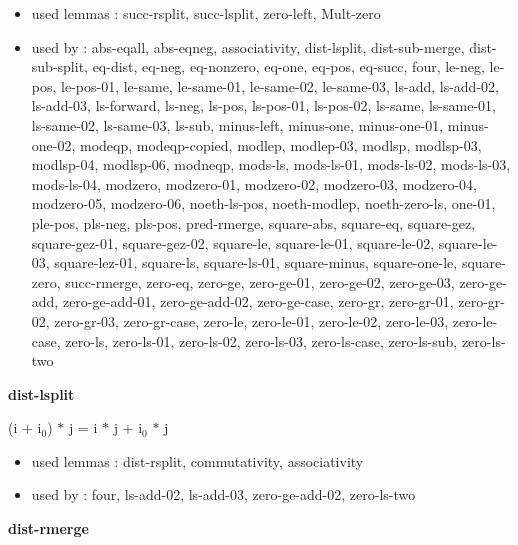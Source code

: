 \documentclass[a4paper]{article}
\begin{document}
\begin{itemize}


\item       used lemmas  : succ-rsplit, succ-lsplit, zero-left, Mult-zero
\item       used by      : abs-eqall, abs-eqneg, associativity, dist-lsplit, dist-sub-merge, dist-sub-split, eq-dist, eq-neg, eq-nonzero, eq-one, eq-pos, eq-succ, four, le-neg, le-pos, le-pos-01, le-same, le-same-01, le-same-02, le-same-03, ls-add, ls-add-02, ls-add-03, ls-forward, ls-neg, ls-pos, ls-pos-01, ls-pos-02, ls-same, ls-same-01, ls-same-02, ls-same-03, ls-sub, minus-left, minus-one, minus-one-01, minus-one-02, modeqp, modeqp-copied, modlep, modlep-03, modlsp, modlsp-03, modlsp-04, modlsp-06, modneqp, mods-ls, mods-ls-01, mods-ls-02, mods-ls-03, mods-ls-04, modzero, modzero-01, modzero-02, modzero-03, modzero-04, modzero-05, modzero-06, noeth-ls-pos, noeth-modlep, noeth-zero-ls, one-01, ple-pos, pls-neg, pls-pos, pred-rmerge, square-abs, square-eq, square-gez, square-gez-01, square-gez-02, square-le, square-le-01, square-le-02, square-le-03, square-lez-01, square-ls, square-ls-01, square-minus, square-one-le, square-zero, succ-rmerge, zero-eq, zero-ge, zero-ge-01, zero-ge-02, zero-ge-03, zero-ge-add, zero-ge-add-01, zero-ge-add-02, zero-ge-case, zero-gr, zero-gr-01, zero-gr-02, zero-gr-03, zero-gr-case, zero-le, zero-le-01, zero-le-02, zero-le-03, zero-le-case, zero-ls, zero-ls-01, zero-ls-02, zero-ls-03, zero-ls-case, zero-ls-sub, zero-ls-two

\end{itemize}

\medskip

\bigskip

{\large\bf dist-lsplit}

\medskip

 \Fol (i + $\mbox{i}_{0}$) $*$ j = i $*$ j + $\mbox{i}_{0}$ $*$ j

\begin{itemize}


\item       used lemmas  : dist-rsplit, commutativity, associativity
\item       used by      : four, ls-add-02, ls-add-03, zero-ge-add-02, zero-ls-two

\end{itemize}

\medskip

\bigskip

{\large\bf dist-rmerge}
\end{document}
